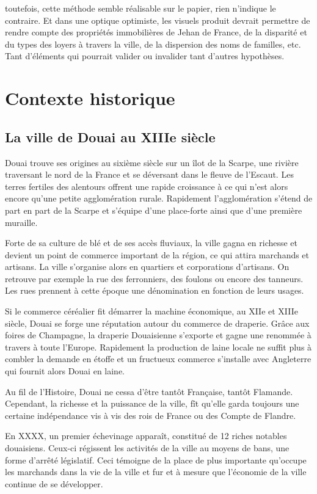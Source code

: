 toutefois, cette méthode semble réalisable sur le papier, rien n'indique le contraire. Et dans une optique optimiste,  les visuels produit devrait permettre de rendre compte des propriétés immobilières de Jehan de France, de la disparité et du types des loyers à travers  la ville, de la dispersion des noms de familles, etc.
Tant d'éléments qui pourrait valider ou invalider tant d'autres hypothèses. 

\section{Contexte historique}
\subsection{La ville de Douai au XIIIe siècle}

Douai trouve ses origines au sixième siècle sur un îlot de la Scarpe, une rivière traversant le nord de la France et se déversant dans le fleuve de l'Escaut. Les terres fertiles des alentours offrent une rapide croissance à ce qui n'est alors encore qu'une petite agglomération rurale. Rapidement l'agglomération s'étend de part en part de la Scarpe et s'équipe d'une place-forte ainsi que d'une première muraille. 

Forte de sa culture de blé et de ses accès fluviaux, la ville gagna en richesse et devient un point de commerce important de la région, ce qui attira marchands et artisans. La ville s'organise alors en quartiers et corporations d'artisans. On retrouve par exemple la rue des ferronniers, des foulons ou encore des tanneurs. Les rues prennent à cette époque une dénomination en fonction de leurs usages.

Si le commerce céréalier fit démarrer la machine économique, au XIIe et XIIIe siècle, Douai se forge une réputation autour du commerce de draperie. 
Grâce aux foires de Champagne, la draperie Douaisienne s'exporte et gagne  une renommée à travers à toute l'Europe. Rapidement la production de laine locale ne suffit plus à combler la demande en étoffe et un fructueux commerce s'installe avec Angleterre qui fournit alors Douai en laine.

Au fil de l'Histoire, Douai ne cessa d'être tantôt Française, tantôt Flamande. Cependant, la richesse et la puissance de la ville, fît  qu'elle garda toujours une certaine indépendance vis à vis des rois de France ou des Compte de Flandre.

En XXXX, un premier échevinage apparaît, constitué de 12 riches notables douaisiens. Ceux-ci régissent les activités de la ville au moyens de bans, une forme d'arrêté législatif. Ceci témoigne de la place de plus importante qu'occupe les marchands dans la vie de la ville et fur et à mesure que l'économie de la ville continue de se développer.


